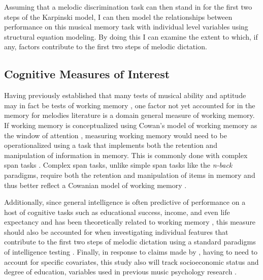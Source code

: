 \documentclass[]{book}
\begin{document}
Assuming that a melodic discrimination task can then stand in for the first two steps of the Karpinski model, I can then model the relationships between performance on this musical memory task with individual level variables using structural equation modeling.
By doing this I can examine the extent to which, if any, factors contribute to the first two steps of melodic dictation.

\hypertarget{cognitive-measures-of-interest}{%
\subsection{Cognitive Measures of Interest}\label{cognitive-measures-of-interest}}

Having previously established that many tests of musical ability and aptitude may in fact be tests of working memory \citep{berzWorkingMemoryMusic1995}, one factor not yet accounted for in the memory for melodies literature is a domain general measure of working memory.
If working memory is conceptualized using Cowan's model of working memory as the window of attention \citep{cowanMagicalMysteryFour2010}, measuring working memory would need to be operationalized using a task that implements both the retention and manipulation of information in memory.
This is commonly done with complex span tasks \citep{unsworthAutomatedVersionOperation2005}.
Complex span tasks, unlike simple span tasks like the \emph{n-back} paradigms, require both the retention and manipulation of items in memory and thus better reflect a Cowanian model of working memory \citep{cowanWorkingMemoryCapacity2005}.

Additionally, since general intelligence is often predictive of performance on a host of cognitive tasks such as educational success, income, and even life expectancy \citep{ritchieIntelligenceAllThat2015} and has been theoretically related to working memory \citep{kovacsProcessOverlapTheory2016}, this measure should also be accounted for when investigating individual features that contribute to the first two steps of melodic dictation using a standard paradigms of intelligence testing \citep{ravenManualRavenProgressive1994, thurstonePrimaryMentalAbilities1938}.
Finally, in response to claims made by \citet{okadaIndividualDifferencesMusical2018}, having to need to account for specific covariates, this study also will track socioeconomic status and degree of education, variables used in previous music psychology research \citep{corrigallMusicTrainingCognition2013, swaminathanRevisitingAssociationMusic2017}.
\end{document}
